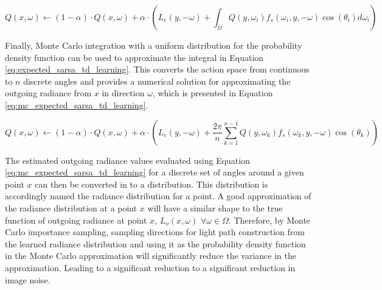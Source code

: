 \documentclass[../dissertation.tex]{subfiles}
\begin{document}
\begin{equation}
Q(x, \omega) \leftarrow (1 - \alpha) \cdot Q(x, \omega) + \alpha \cdot \left( L_e(y, -\omega) + \int_\Omega Q(y, \omega_i) f_s(\omega_i, y, -\omega) \cos(\theta_i) d\omega_i \right)
\label{eq:expected_sarsa_td_learning}
\end{equation}

Finally, Monte Carlo integration with a uniform distribution for the probability density function can be used to approximate the integral in Equation \ref{eq:expected_sarsa_td_learning}. This converts the action space from continuous to $n$ discrete angles and provides a numerical solution for approximating the outgoing radiance from $x$ in direction $\omega$, which is presented in Equation \ref{eq:mc_expected_sarsa_td_learning}.

\begin{equation}
Q(x, \omega) \leftarrow (1 - \alpha) \cdot Q(x, \omega) + \alpha \cdot \left( L_e(y, -\omega) +\frac{2 \pi}{n} \sum_{k=1}^{n-1} Q(y, \omega_k) f_s(\omega_k, y, -\omega) \cos(\theta_k)  \right)
\label{eq:mc_expected_sarsa_td_learning}
\end{equation}

The estimated outgoing radiance values evaluated using Equation \ref{eq:mc_expected_sarsa_td_learning} for a discrete set of angles around a given  point $x$ can then be converted in to a distribution. This distribution is accordingly named the radiance distribution for a point. A good approximation of the radiance distribution at a point $x$ will have a similar shape to the true function of outgoing radiance at point $x$, $L_o(x, \omega)$ $\forall \omega \in \Omega$. Therefore, by Monte Carlo importance sampling, sampling directions for light path construction from the learned radiance distribution and using it as the probability density function in the Monte Carlo approximation will significantly reduce the variance in the approximation. Leading to a significant reduction to a significant reduction in image noise.
\end{document}
